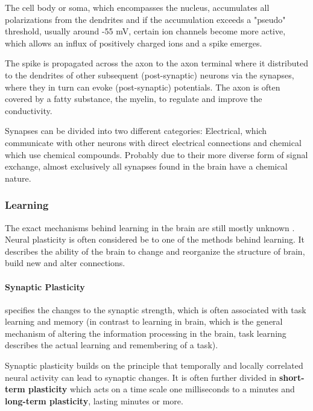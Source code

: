 The cell body or soma, which encompasses the nucleus, accumulates all polarizations from the dendrites and if the accumulation exceeds a "pseudo" threshold, usually around -55 mV, certain ion channels become more active, which allows an influx of positively charged ions and a spike emerges.

The spike is propagated across the axon to the axon terminal where it distributed to the dendrites of other subsequent (post-synaptic) neurons via the synapses, where they in turn can evoke (post-synaptic) potentials.
The axon is often covered by a fatty substance, the myelin, to regulate and improve the conductivity.

Synapses can be divided into two different categories: Electrical, which communicate with other neurons with direct electrical connections and chemical which use chemical compounds.
Probably due to their more diverse form of signal exchange, almost exclusively all synapses found in the brain have a chemical nature.

\subsubsection{Learning} \label{c:natlearning}

The exact mechanisms behind learning in the brain are still mostly unknown \cite{gerstner2014neuronal}\cite{Byrne1997}\cite{Markram2012}.
Neural plasticity is often considered be to one of the methods behind learning. 
It describes the ability of the brain to change and reorganize the structure of brain, build new and alter connections.  

\paragraph{Synaptic Plasticity} \label{c:synplasiticity}
specifies the changes to the synaptic strength, which is often associated with task learning and memory (in contrast to learning in brain, which is the general mechanism of altering the information processing in the brain, task learning describes the actual learning and remembering of a task). 

Synaptic plasticity builds on the principle that temporally and locally correlated neural activity  can lead to synaptic changes.
It is often further divided in \textbf{short-term plasticity} which acts on a time scale one milliseconds to a minutes and \textbf{long-term plasticity}, lasting minutes or more.


